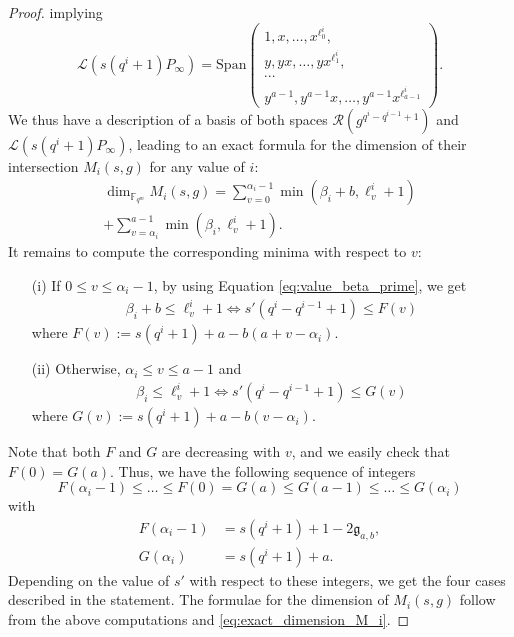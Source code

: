 \documentclass[lettersize,journal]{IEEEtran}
\theoremstyle{plain}
\theoremstyle{definition}
\theoremstyle{remark}
\newcommand{\calL}{\mathcal{L}}
\newcommand{\calR}{\mathcal{R}}
\newcommand{\fqm}{\mathbb{F}_{q^m}}
\begin{document}
\begin{proof}
		implying
		\begin{equation*}
			\calL(s(q^i+1)P_\infty) = \mathrm{Span}    \left( \begin{array}{c}
				1,x,\dots,x^{\ell^i_0},   \\
				y,yx,\dots,yx^{\ell^i_1}, \\
				\cdots \\
				y^{a-1},y^{a-1}x,\dots,y^{a-1}x^{\ell^i_{a-1}}
			\end{array}
			\right).
		\end{equation*}
		We thus have a description of a basis of both spaces $\calR(g^{q^i-q^{i-1}+1})$ and $\calL(s(q^i+1)P_\infty)$, leading to an exact formula for the dimension of their intersection $M_i(s,g)$ for any value of $i$:
		\begin{multline} \label{eq:exact_dimension_M_i}
			\dim_{\fqm} M_i(s,g) = \sum\limits_{v=0}^{\alpha_i-1} \min(\beta_i+b,\ell_v^i+1) \\ + \sum\limits_{v=\alpha_i}^{a-1} \min(\beta_i,\ell_v^i+1).
		\end{multline}
		It remains to compute the corresponding minima with respect to $v$:
		\begin{itemize}
			\item[(i)] If $0 \leq v \leq \alpha_i-1$, by using Equation \eqref{eq:value_beta_prime}, we get
			\begin{align*}
				\beta_i+b \leq \ell_v^i +1 \iff s'(q^i-q^{i-1}+1) \leq F(v)
			\end{align*}
		where $F(v) := s(q^i+1)+a-b(a+v-\alpha_i)$.
			\item[(ii)] Otherwise, $\alpha_i \leq v \leq a-1$ and
			\begin{align*}
				\beta_i \leq \ell_v^i +1 \iff s'(q^i-q^{i-1}+1) \leq G(v)
			\end{align*}
		where $G(v) := s(q^i+1)+a-b(v-\alpha_i)$.
		\end{itemize}
		Note that both $F$ and $G$ are decreasing with $v$, and we easily check that $F(0) = G(a)$. Thus, we have the following sequence of integers
		$$F(\alpha_i-1) \leq \dots \leq F(0) = G(a) \leq G(a-1) \leq \dots \leq G(\alpha_i)$$
		with 
		\begin{align*}
			F(\alpha_i-1)&=s(q^i+1)+1-2\mathfrak{g}_{a,b},\\
			G(\alpha_i)&= s(q^i+1)+a.
		\end{align*}
		Depending on the value of $s'$ with respect to these integers, we get the four cases described in the statement. The formulae for the dimension of $M_i(s,g)$ follow from the above computations and \eqref{eq:exact_dimension_M_i}.

\end{proof}
\end{document}
